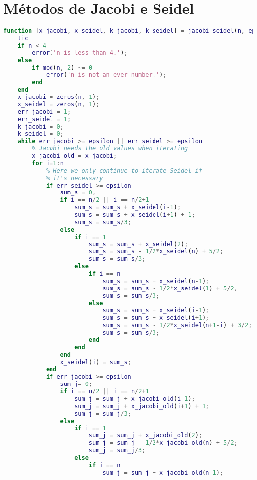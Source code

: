 \documentclass{article}
\begin{document}
    \section{Métodos de Jacobi e Seidel}
        \label{appendix:b}

        \begin{lstlisting}[language=Matlab]
function [x_jacobi, x_seidel, k_jacobi, k_seidel] = jacobi_seidel(n, epsilon)
    tic
    if n < 4
        error('n is less than 4.');
    else
        if mod(n, 2) ~= 0
            error('n is not an ever number.');
        end
    end
    x_jacobi = zeros(n, 1);
    x_seidel = zeros(n, 1);    
    err_jacobi = 1;
    err_seidel = 1;
    k_jacobi = 0;
    k_seidel = 0;
    while err_jacobi >= epsilon || err_seidel >= epsilon
        % Jacobi needs the old values when iterating
        x_jacobi_old = x_jacobi;
        for i=1:n
            % Here we only continue to iterate Seidel if
            % it's necessary
            if err_seidel >= epsilon
                sum_s = 0;
                if i == n/2 || i == n/2+1
                    sum_s = sum_s + x_seidel(i-1);
                    sum_s = sum_s + x_seidel(i+1) + 1;
                    sum_s = sum_s/3;
                else
                    if i == 1
                        sum_s = sum_s + x_seidel(2);
                        sum_s = sum_s - 1/2*x_seidel(n) + 5/2;
                        sum_s = sum_s/3;
                    else
                        if i == n
                            sum_s = sum_s + x_seidel(n-1);
                            sum_s = sum_s - 1/2*x_seidel(1) + 5/2;
                            sum_s = sum_s/3;
                        else
                            sum_s = sum_s + x_seidel(i-1);
                            sum_s = sum_s + x_seidel(i+1);
                            sum_s = sum_s - 1/2*x_seidel(n+1-i) + 3/2;
                            sum_s = sum_s/3;
                        end
                    end
                end
                x_seidel(i) = sum_s;
            end
            if err_jacobi >= epsilon
                sum_j= 0;
                if i == n/2 || i == n/2+1
                    sum_j = sum_j + x_jacobi_old(i-1);
                    sum_j = sum_j + x_jacobi_old(i+1) + 1;
                    sum_j = sum_j/3;
                else
                    if i == 1
                        sum_j = sum_j + x_jacobi_old(2);
                        sum_j = sum_j - 1/2*x_jacobi_old(n) + 5/2;
                        sum_j = sum_j/3;
                    else
                        if i == n
                            sum_j = sum_j + x_jacobi_old(n-1);

\end{lstlisting}
\end{document}
